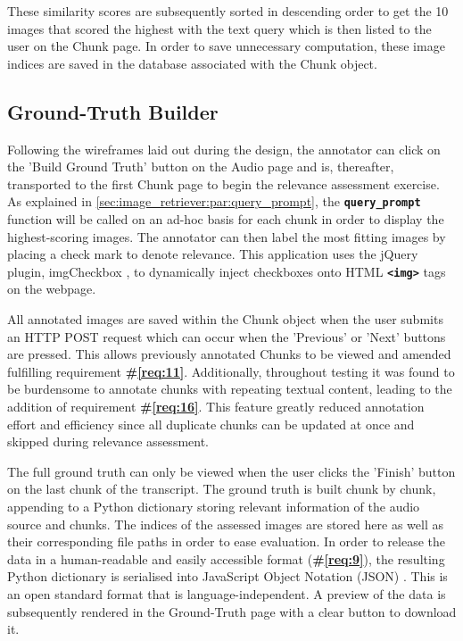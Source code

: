 \documentclass{l4proj}
\begin{document}
These similarity scores are subsequently sorted in descending order to get the 10 images that scored the highest with the text query which is then listed to the user on the Chunk page. In order to save unnecessary computation, these image indices are saved in the database associated with the Chunk object.


\subsection{Ground-Truth Builder}
Following the wireframes laid out during the design, the annotator can click on the 'Build Ground Truth' button on the Audio page and is, thereafter, transported to the first Chunk page to begin the relevance assessment exercise. As explained in \ref{sec:image_retriever:par:query_prompt}, the \textbf{\lstinline|query_prompt|} function will be called on an ad-hoc basis for each chunk in order to display the highest-scoring images. The annotator can then label the most fitting images by placing a check mark to denote relevance. This application uses the jQuery plugin, imgCheckbox \citep{imgcheckbox}, to dynamically inject checkboxes onto HTML \textbf{\lstinline|<img>|} tags on the webpage. 

All annotated images are saved within the Chunk object when the user submits an HTTP POST request which can occur when the 'Previous' or 'Next' buttons are pressed. This allows previously annotated Chunks to be viewed and amended fulfilling requirement \textbf{\#\ref{req:11}}. Additionally, throughout testing it was found to be burdensome to annotate chunks with repeating textual content, leading to the addition of requirement \textbf{\#\ref{req:16}}. This feature greatly reduced annotation effort and efficiency since all duplicate chunks can be updated at once and skipped during relevance assessment.

The full ground truth can only be viewed when the user clicks the 'Finish' button on the last chunk of the transcript. The ground truth is built chunk by chunk, appending to a Python dictionary storing relevant information of the audio source and chunks. The indices of the assessed images are stored here as well as their corresponding file paths in order to ease evaluation. In order to release the data in a human-readable and easily accessible format (\textbf{\#\ref{req:9}}), the resulting Python dictionary is serialised into JavaScript Object Notation (JSON) \citep{json}. This is an open standard format that is language-independent. A preview of the data is subsequently rendered in the Ground-Truth page with a clear button to download it.
\end{document}

